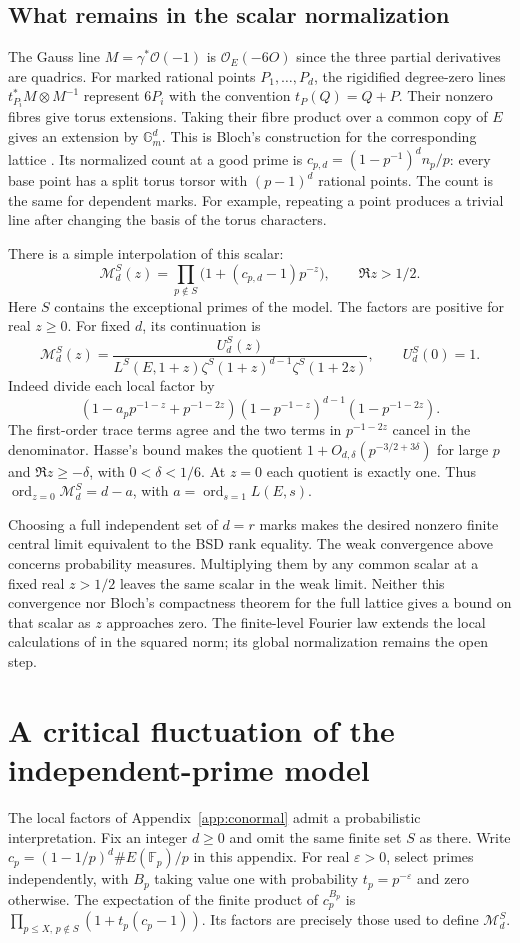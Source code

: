 \documentclass[11pt]{article}
\begin{document}
\subsection{What remains in the scalar normalization}

The Gauss line $M=\gamma^*\mathcal O(-1)$ is $\mathcal O_E(-6O)$
since the three partial derivatives are quadrics. For marked rational
points $P_1,\ldots,P_d$, the rigidified degree-zero lines
$t_{P_i}^*M\otimes M^{-1}$ represent $6P_i$ with the convention
$t_P(Q)=Q+P$. Their nonzero fibres give torus extensions. Taking their
fibre product over a common copy of $E$ gives an extension by
$\mathbb G_m^d$. This is Bloch's construction for the corresponding
lattice \cite{Bloch}. Its normalized count at a good prime is
$c_{p,d}=(1-p^{-1})^d n_p/p$: every base point has a split torus
torsor with $(p-1)^d$ rational points. The count is the same for
dependent marks. For example, repeating a point produces a trivial
line after changing the basis of the torus characters.

There is a simple interpolation of this scalar:
\[
 \mathcal M_d^S(z)=\prod_{p\notin S}\bigl(1+(c_{p,d}-1)p^{-z}\bigr),
 \qquad \Re z>1/2.
\]
Here $S$ contains the exceptional primes of the model. The factors
are positive for real $z\ge0$. For fixed $d$, its continuation is
\[
 \mathcal M_d^S(z)=
 \frac{U_d^S(z)}
 {L^S(E,1+z)\zeta^S(1+z)^{d-1}\zeta^S(1+2z)},\qquad U_d^S(0)=1.
\]
Indeed divide each local factor by
\[
 (1-a_pp^{-1-z}+p^{-1-2z})(1-p^{-1-z})^{d-1}(1-p^{-1-2z}).
\]
The first-order trace terms agree and the two terms in $p^{-1-2z}$
cancel in the denominator. Hasse's bound makes the quotient
$1+O_{d,\delta}(p^{-3/2+3\delta})$ for large $p$ and $\Re z\ge-\delta$,
with $0<\delta<1/6$. At $z=0$ each quotient is exactly one.
Thus $\operatorname{ord}_{z=0}\mathcal M_d^S=d-a$, with
$a=\operatorname{ord}_{s=1}L(E,s)$.

Choosing a full independent set of $d=r$ marks makes the desired
nonzero finite central limit equivalent to the BSD rank equality.
The weak convergence above concerns probability measures. Multiplying
them by any common scalar at a fixed real $z>1/2$ leaves the same
scalar in the weak limit. Neither this convergence nor Bloch's
compactness theorem for the full lattice gives a bound on that scalar
as $z$ approaches zero. The finite-level Fourier law extends the local
calculations of \cite[\S3]{CLT} in the squared norm; its global
normalization remains the open step.

\section{A critical fluctuation of the independent-prime model}
\label{app:bernoulli}
The local factors of Appendix~\ref{app:conormal} admit a probabilistic
interpretation. Fix an integer $d\ge0$ and omit the same finite set
$S$ as there. Write $c_p=(1-1/p)^d\#E(\mathbb F_p)/p$ in this
appendix. For real $\varepsilon>0$, select primes independently, with
$B_p$ taking value one with probability $t_p=p^{-\varepsilon}$ and zero
otherwise. The expectation of the finite product of $c_p^{B_p}$ is
$\prod_{p\le X,\,p\notin S}(1+t_p(c_p-1))$. Its factors are precisely
those used to define $\mathcal M_d^S$.
\end{document}

